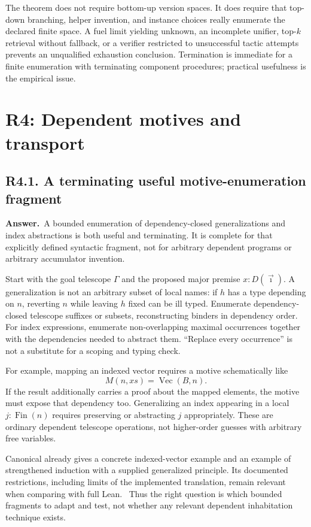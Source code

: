 \documentclass[11pt,a4paper]{article}
\newcommand{\qid}[3]{\subsection{#2. #3}\label{#1}}
\newcommand{\answer}{\noindent\textbf{Answer.}\ }
\theoremstyle{remark}
\begin{document}
The theorem does not require bottom-up version spaces. It does require that top-down branching, helper invention, and instance choices really enumerate the declared finite space. A fuel limit yielding unknown, an incomplete unifier, top-$k$ retrieval without fallback, or a verifier restricted to unsuccessful tactic attempts prevents an unqualified exhaustion conclusion. Termination is immediate for a finite enumeration with terminating component procedures; practical usefulness is the empirical issue.

\section{R4: Dependent motives and transport}\label{sec:r4}

\qid{q41}{R4.1}{A terminating useful motive-enumeration fragment}
\answer A bounded enumeration of dependency-closed generalizations and index abstractions is both useful and terminating. It is complete for that explicitly defined syntactic fragment, not for arbitrary dependent programs or arbitrary accumulator invention.

Start with the goal telescope $\Gamma$ and the proposed major premise $x:D(\vec\imath)$. A generalization is not an arbitrary subset of local names: if $h$ has a type depending on $n$, reverting $n$ while leaving $h$ fixed can be ill typed. Enumerate dependency-closed telescope suffixes or subsets, reconstructing binders in dependency order. For index expressions, enumerate non-overlapping maximal occurrences together with the dependencies needed to abstract them. ``Replace every occurrence'' is not a substitute for a scoping and typing check.

For example, mapping an indexed vector requires a motive schematically like
\[
 M(n,xs)=\operatorname{Vec}(B,n).
\]
If the result additionally carries a proof about the mapped elements, the motive must expose that dependency too. Generalizing an index appearing in a local $j:\operatorname{Fin}(n)$ requires preserving or abstracting $j$ appropriately. These are ordinary dependent telescope operations, not higher-order guesses with arbitrary free variables.

Canonical already gives a concrete indexed-vector example and an example of strengthened induction with a supplied generalized principle. Its documented restrictions, including limits of the implemented translation, remain relevant when comparing with full Lean.~\cite{canonical} Thus the right question is which bounded fragments to adapt and test, not whether any relevant dependent inhabitation technique exists.
\end{document}
